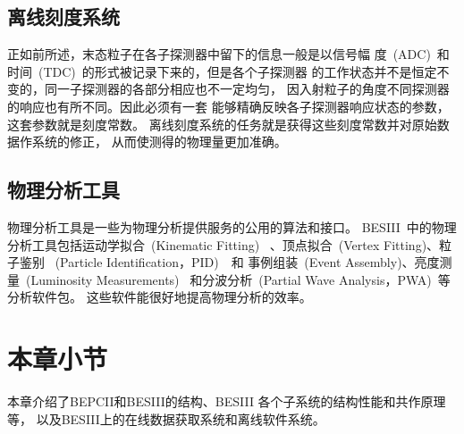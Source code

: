\subsection{离线刻度系统}
正如前所述，末态粒子在各子探测器中留下的信息一般是以信号幅
度~(ADC)~和时间~(TDC)~的形式被记录下来的，但是各个子探测器
的工作状态并不是恒定不变的，同一子探测器的各部分相应也不一定均匀，
因入射粒子的角度不同探测器的响应也有所不同。因此必须有一套
能够精确反映各子探测器响应状态的参数，这套参数就是刻度常数。
离线刻度系统的任务就是获得这些刻度常数并对原始数据作系统的修正，
从而使测得的物理量更加准确。

\subsection{物理分析工具}
物理分析工具是一些为物理分析提供服务的公用的算法和接口。
BESIII~中的物理分析工具包括运动学拟合~(Kinematic Fitting)
~\cite{Yan:2010zze}、顶点拟合~(Vertex Fitting)、粒子鉴别~
(Particle Identification，PID)~\cite{Gang_2008}~和
事例组装~(Event Assembly)、亮度测量~(Luminosity Measurements)~
和分波分析~(Partial Wave Analysis，PWA)~等分析软件包。
这些软件能很好地提高物理分析的效率。

\section{本章小节}
本章介绍了BEPCII和BESIII的结构、BESIII 各个子系统的结构性能和共作原理等，
以及BESIII上的在线数据获取系统和离线软件系统。


